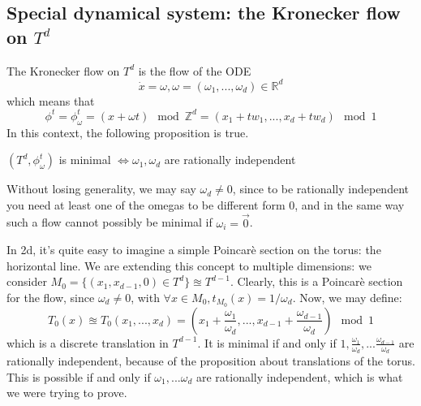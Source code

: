 \subsection{Special dynamical system: the Kronecker flow on $T^d$}
The Kronecker flow on $T^d$ is the flow of the ODE \begin{equation*}
\dot{x}=\omega, \omega=(\omega_1,...,\omega_d)\in\mathbb{R}^d \end{equation*} which means that \begin{equation*}
\phi^t=\phi^t_{\omega}=(x+\omega t) \mod \mathbb{Z}^d=(x_1+tw_1, ..., x_d+tw_d) \mod 1
\end{equation*}
In this context, the following proposition is true.

\begin{proposition}
    $(T^d, \phi^t_{\omega})$ is minimal $\iff\omega_1, \omega_d$ are rationally independent
\end{proposition}
Without losing generality, we may say $\omega_d\neq 0$, since to be rationally independent you need at least one of the omegas to be different form 0, and in the same way such a flow cannot possibly be minimal if $\omega_i=\vec{0}$.

In 2d, it's quite easy to imagine a simple Poincarè section on the torus: the horizontal line. We are extending this concept to multiple dimensions: we consider $M_0=\{(x_1, x_{d-1}, 0)\in T^d\}\approxeq T^{d-1}$. Clearly, this is a Poincarè section for the flow, since $\omega_d\neq 0$, with $\forall x\in M_0, t_{M_0}(x)=1/\omega_d$. Now, we may define: \begin{equation*}
T_0(x)\approxeq T_0(x_1,..., x_d)=(x_1+\frac{\omega_1}{\omega_d},...,x_{d-1}+\frac{\omega_{d-1}}{\omega_d})\mod 1
\end{equation*}
which is a discrete translation in $T^{d-1}$. It is minimal if and only if $1, \frac{\omega_1}{\omega_d}, ...\frac{\omega_{d-1}}{\omega_d}$ are rationally independent, because of the proposition about translations of the torus. This is possible if and only if $\omega_1, ...\omega_d$ are rationally independent, which is what we were trying to prove. 


